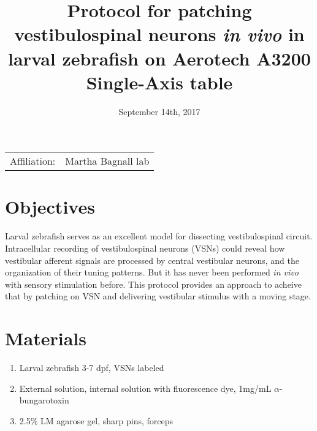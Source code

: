 \documentclass[11pt]{article}
\title{Protocol for patching vestibulospinal neurons \textit{in vivo} in larval zebrafish on Aerotech A3200 Single-Axis table}
\date{September 14th, 2017}
\begin{document}
	\maketitle
	\thispagestyle{fancy}
	\begin{center}
		\begin{tabular}	{l r}
			Affiliation: & Martha Bagnall lab \\
		\end{tabular}
	\end{center}

\section{Objectives}
Larval zebrafish serves as an excellent model for dissecting vestibulospinal circuit. Intracellular recording of vestibulospinal neurons (VSNs) could reveal how vestibular afferent signals are processed by central vestibular neurons, and the organization of their tuning patterns. But it has never been performed \textit{in vivo} with sensory stimulation before. This protocol provides an approach to acheive that by patching on VSN and delivering vestibular stimulus with a moving stage.

\section{Materials}
	\begin{enumerate}[label=(\alph*)]
		\item Larval zebrafish 3-7 dpf, VSNs labeled
		\item External solution, internal solution with fluorescence dye, 1mg/mL $\alpha$-bungarotoxin
		\item 2.5\% LM agarose gel, sharp pins, forceps
	\end{enumerate}
\end{document}
